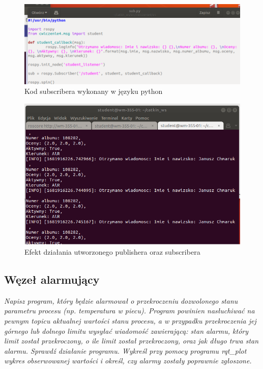 \documentclass[10pt,a4paper,twoside,twocolumn]{article}%
\begin{document}
\begin{figure}[H]
    \centering
    \includegraphics[width=1\linewidth]{sub_py.png}
    \caption{Kod subscribera wykonany w języku python}
\end{figure}

\begin{figure}[H]
    \centering
    \includegraphics[width=1\linewidth]{konsola.png}
    \caption{Efekt działania utworzonego publishera oraz subscribera}
\end{figure}

\subsection{Węzeł alarmujący}
\textit{Napisz program, który będzie alarmował o przekroczeniu dozwolonego stanu
parametru procesu (np. temperatura w piecu). Program powinien nasłuchiwać na
pewnym topicu aktualnej wartości stanu procesu, a w przypadku przekroczenia jej
górnego lub dolnego limitu wysyłać wiadomość zawierającą: stan alarmu, który
limit został przekroczony, o ile limit został przekroczony, oraz jak długo trwa
stan alarmu. Sprawdź działanie programu. Wykreśl przy pomocy programu rqt\_plot
wykres obserwowanej wartości i określ, czy alarmy zostały poprawnie zgłoszone.}
\end{document}
